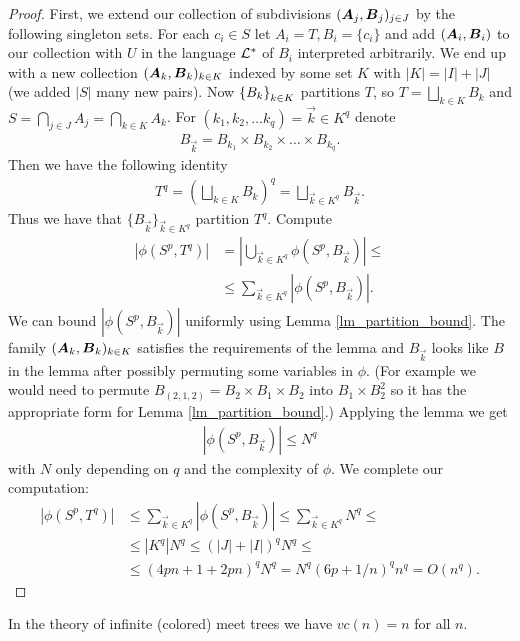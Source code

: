 \begin{proof}
  First, we extend our collection of subdivisions $(\operatorname{\boldsymbol A}_j, \operatorname{\boldsymbol B}_j)_{j \in J}$ by the following singleton sets.
  For each $c_i \in S$ let $A_i = T, B_i = \{c_i\}$ and add $(\operatorname{\boldsymbol A}_i, \operatorname{\boldsymbol B}_i)$ to our collection with $U$ in the language $\mathcal L^*$ of $B_i$ interpreted arbitrarily.
  We end up with a new collection $(\operatorname{\boldsymbol A}_k, \operatorname{\boldsymbol B}_k)_{k \in K}$ indexed by some set $K$ with $|K| = |I| + |J|$ (we added $|S|$ many new pairs). Now $\left\{B_k\right\}_{k \in K}$ partitions $T$, so $T = \bigsqcup_{k \in K} B_k$ and $S = \bigcap_{j \in J} A_j = \bigcap_{k \in K} A_k$. For $(k_1, k_2, \ldots k_q) = \vec k \in K^q$ denote 
  \begin{align*}
    B_{\vec k} = B_{k_1} \times B_{k_2} \times \ldots \times B_{k_q}.
  \end{align*}
  Then we have the following identity
  \begin{align*}
    T^q = (\bigsqcup_{k \in K} B_k)^q = \bigsqcup_{\vec k \in K^q} B_{\vec k}.
  \end{align*}
  Thus we have that $\{B_{\vec k}\}_{\vec k \in K^q}$ partition $T^q$. Compute
  \begin{align*}
    |\phi(S^p, T^q)|
    &= \left|\bigcup_{\vec k \in K^q} \phi(S^p, B_{\vec k}) \right| \leq \\
    &\leq \sum_{\vec k \in K^q} |\phi(S^p, B_{\vec k})|.
  \end{align*}
  We can bound $|\phi(S^p, B_{\vec k})|$ uniformly using Lemma \ref{lm_partition_bound}. The family $(\operatorname{\boldsymbol A}_k, \operatorname{\boldsymbol B}_k)_{k \in K}$ satisfies the requirements of the lemma and $B_{\vec k}$ looks like $B$ in the lemma after possibly permuting some variables in $\phi$.
  (For example we would need to permute $B_{(2,1,2)} = B_2 \times B_1 \times B_2$ into $B_1 \times B_2^2$ so it has the appropriate form for Lemma \ref{lm_partition_bound}.)
  Applying the lemma we get
  \begin{align*}
    |\phi(S^p, B_{\vec k})| \leq N^q
  \end{align*}
  with $N$ only depending on $q$ and the complexity of $\phi$. We complete our computation:
  \begin{align*}
    |\phi(S^p, T^q)|
    &\leq \sum_{\vec k \in K^q} |\phi(S^p, B_{\vec k})| \leq \sum_{\vec k \in K^q} N^q \leq \\
    &\leq |K^q| N^q \leq (|J| + |I|)^q N^q \leq \\
    &\leq (4pn + 1 + 2pn)^q N^q = N^q (6p + 1/n)^q n^q = O(n^q).
  \end{align*}
\end{proof}
\begin{Corollary}
  In the theory of infinite (colored) meet trees we have $vc(n) = n$ for all $n$.
\end{Corollary}
